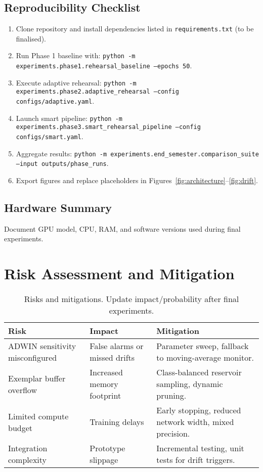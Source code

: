 \documentclass[12pt,a4paper]{article}
\begin{document}
\subsection{Reproducibility Checklist}
\begin{enumerate}[label=\textbf{R\arabic*}]
    \item Clone repository and install dependencies listed in \texttt{requirements.txt} (to be finalised).
    \item Run Phase 1 baseline with: \texttt{python -m experiments.phase1.rehearsal\_baseline --epochs 50}.
    \item Execute adaptive rehearsal: \texttt{python -m experiments.phase2.adaptive\_rehearsal --config configs/adaptive.yaml}.
    \item Launch smart pipeline: \texttt{python -m experiments.phase3.smart\_rehearsal\_pipeline --config configs/smart.yaml}.
    \item Aggregate results: \texttt{python -m experiments.end\_semester.comparison\_suite --input outputs/phase\_runs}. 
    \item Export figures and replace placeholders in Figures~\ref{fig:architecture}--\ref{fig:drift}.
\end{enumerate}

\subsection{Hardware Summary}
Document GPU model, CPU, RAM, and software versions used during final experiments.

\section{Risk Assessment and Mitigation}
\begin{table}[H]
    \centering
    \caption{Risks and mitigations. Update impact/probability after final experiments.}
    \begin{tabular}{p{}p{}p{}}
        \toprule
        \textbf{Risk} & \textbf{Impact} & \textbf{Mitigation}\\
        \midrule
        ADWIN sensitivity misconfigured & False alarms or missed drifts & Parameter sweep, fallback to moving-average monitor.\\
        Exemplar buffer overflow & Increased memory footprint & Class-balanced reservoir sampling, dynamic pruning.\\
        Limited compute budget & Training delays & Early stopping, reduced network width, mixed precision.\\
        Integration complexity & Prototype slippage & Incremental testing, unit tests for drift triggers.\\
        \bottomrule
    \end{tabular}
\end{table}
\end{document}
